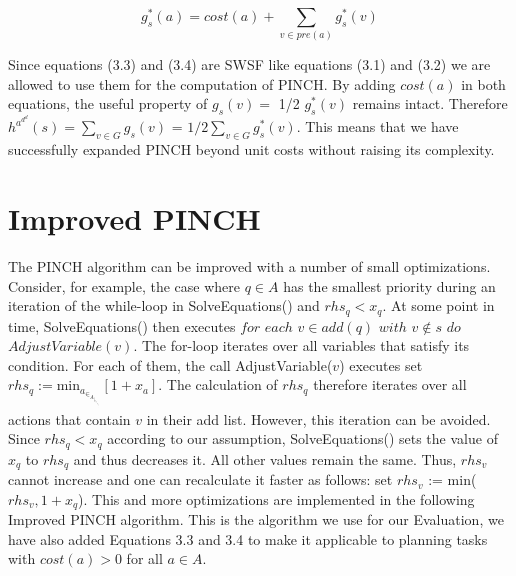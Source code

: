 \begin{equation}
    g^*_s(a) = cost(a) + \sum_{v \in pre(a)}^{} g^*_s(v)
\end{equation}

Since equations (3.3) and (3.4) are SWSF like equations (3.1) and (3.2) we are allowed to use them for the computation of PINCH. By adding $cost(a)$ in both equations, the useful property of $g_s(v) =$ 1/2 $g^*_s(v)$ remains intact. Therefore $h^a^d^d(s) = \sum_{v \in G}^{} g_s(v)$ = $1/2 \sum_{v \in G}^{} g^*_s(v)$. This means that we have successfully expanded PINCH beyond unit costs without raising its complexity.
\section{Improved PINCH}
The PINCH algorithm can be improved with a number of small optimizations. Consider, for example, the case where $q \in A$ has the smallest priority during an iteration of the while-loop in SolveEquations() and $rhs_q < x_q$. At some point in time, SolveEquations() then executes $for$ $each$ $v \in add(q)$ $with$ $v \notin s$ $do$ $AdjustVariable(v)$. The for-loop iterates over all variables that satisfy its condition. For each of them, the call AdjustVariable($v$) executes set $rhs_q := \text{min}_a_\in_A_|_v_\in_a_d_d_(_a_) [1 + x_a]$. The calculation of $rhs_q$ therefore iterates over all actions that contain $v$ in their add list. However, this iteration can be avoided. Since $rhs_q < x_q$ according to our assumption, SolveEquations() sets the value of $x_q$ to $rhs_q$ and thus decreases it. All other values remain the same. Thus, $rhs_v$ cannot increase and one can recalculate it faster as follows: set $rhs_v$ := min($rhs_v, 1 + x_q$). This and more optimizations are implemented in the following Improved PINCH algorithm.\cite{main} This is the algorithm we use for our Evaluation, we have also added Equations 3.3 and 3.4 to make it applicable to planning tasks with $cost(a) > 0$ for all $a \in A$.
\newpage
